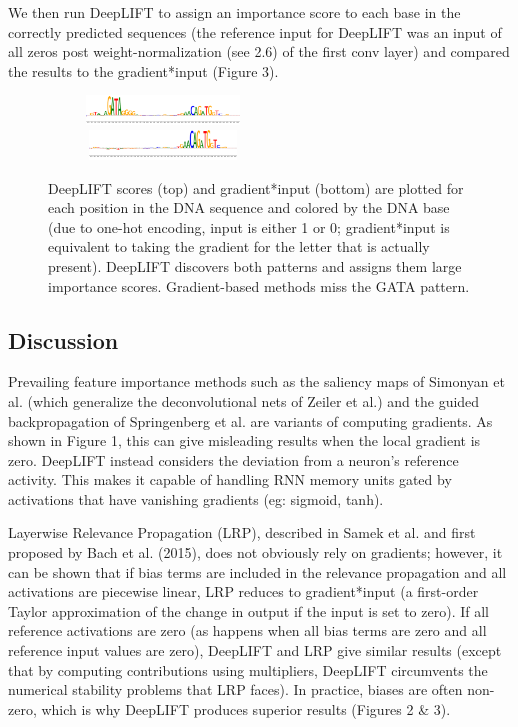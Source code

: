 \documentclass{article}
\begin{document}
We then run DeepLIFT to assign an importance score to each base in the correctly predicted sequences (the reference input for DeepLIFT was an input of all zeros post weight-normalization (see 2.6) of the first conv layer) and compared the results to the gradient*input (Figure 3).

\begin{figure}[!ht]
\vspace{-10px}
\begin{center}
\includegraphics[width=230px,height=30px]{LIFTPADSequence2.png}
\includegraphics[width=230px,height=30px]{GradientSequence2.png}
\caption{DeepLIFT scores (top) and gradient*input (bottom) are plotted for each position in the DNA sequence and colored by the DNA base (due to one-hot encoding, input is either 1 or 0; gradient*input is equivalent to taking the gradient for the letter that is actually present). DeepLIFT discovers both patterns and assigns them large importance scores. Gradient-based methods miss the GATA pattern.}
\end{center}
\vspace{-20px}
\end{figure}
\subsection{Discussion}

Prevailing feature importance methods such as the saliency maps of Simonyan et al. (which generalize the deconvolutional nets of Zeiler et al.) and the guided backpropagation of Springenberg et al. are variants of computing gradients. As shown in Figure 1, this can give misleading results when the local gradient is zero. DeepLIFT instead considers the deviation from a neuron's reference activity. This makes it capable of handling RNN memory units gated by activations that have vanishing gradients (eg: sigmoid, tanh).

Layerwise Relevance Propagation (LRP), described in Samek et al. and first proposed by Bach et al. (2015), does not obviously rely on gradients; however, it can be shown that if bias terms are included in the relevance propagation and all activations are piecewise linear, LRP reduces to gradient*input (a first-order Taylor approximation of the change in output if the input is set to zero). If all reference activations are zero (as happens when all bias terms are zero and all reference input values are zero), DeepLIFT and LRP give similar results (except that by computing contributions using multipliers, DeepLIFT circumvents the numerical stability problems that LRP faces). In practice, biases are often non-zero, which is why DeepLIFT produces superior results (Figures 2 \& 3).
\end{document}
